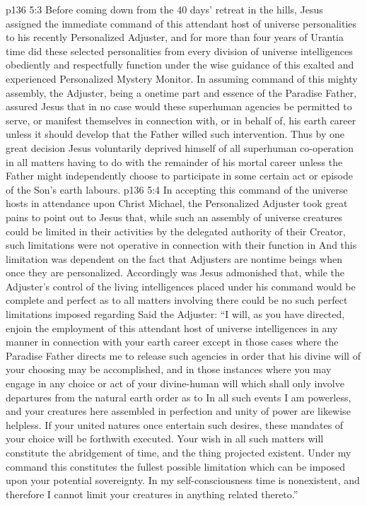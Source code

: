 \vs p136 5:3 \pc Before coming down from the 40 days’ retreat in the hills, Jesus assigned the immediate command of this attendant host of universe personalities to his recently Personalized Adjuster, and for more than four years of Urantia time did these selected personalities from every division of universe intelligences obediently and respectfully function under the wise guidance of this exalted and experienced Personalized Mystery Monitor. In assuming command of this mighty assembly, the Adjuster, being a onetime part and essence of the Paradise Father, assured Jesus that in no case would these superhuman agencies be permitted to serve, or manifest themselves in connection with, or in behalf of, his earth career unless it should develop that the Father willed such intervention. Thus by one great decision Jesus voluntarily deprived himself of all superhuman co\hyp{}operation in all matters having to do with the remainder of his mortal career unless the Father might independently choose to participate in some certain act or episode of the Son’s earth labours.
\vs p136 5:4 In accepting this command of the universe hosts in attendance upon Christ Michael, the Personalized Adjuster took great pains to point out to Jesus that, while such an assembly of universe creatures could be limited in their  activities by the delegated authority of their Creator, such limitations were not operative in connection with their function in  And this limitation was dependent on the fact that Adjusters are nontime beings when once they are personalized. Accordingly was Jesus admonished that, while the Adjuster’s control of the living intelligences placed under his command would be complete and perfect as to all matters involving  there could be no such perfect limitations imposed regarding  Said the Adjuster: “I will, as you have directed, enjoin the employment of this attendant host of universe intelligences in any manner in connection with your earth career except in those cases where the Paradise Father directs me to release such agencies in order that his divine will of your choosing may be accomplished, and in those instances where you may engage in any choice or act of your divine\hyp{}human will which shall only involve departures from the natural earth order as to  In all such events I am powerless, and your creatures here assembled in perfection and unity of power are likewise helpless. If your united natures once entertain such desires, these mandates of your choice will be forthwith executed. Your wish in all such matters will constitute the abridgement of time, and the thing projected  existent. Under my command this constitutes the fullest possible limitation which can be imposed upon your potential sovereignty. In my self\hyp{}consciousness time is nonexistent, and therefore I cannot limit your creatures in anything related thereto.”
